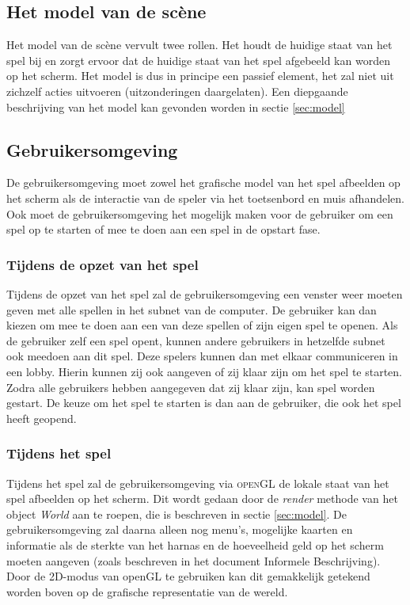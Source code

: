 \documentclass[a4paper,11pt]{article}
\begin{document}
    \subsection{Het model van de sc\`ene}
    Het model van de sc\`ene vervult twee rollen. Het houdt de huidige staat van het spel bij en zorgt ervoor dat de huidige staat van het spel afgebeeld kan worden op het scherm. Het model is dus in principe een passief element, het zal niet uit zichzelf acties uitvoeren (uitzonderingen daargelaten). Een diepgaande beschrijving van het model kan gevonden worden in sectie \ref{sec:model}

    \subsection{Gebruikersomgeving}
   	De gebruikersomgeving moet zowel het grafische model van het spel afbeelden op het scherm als de interactie van de speler via het toetsenbord en muis afhandelen. Ook moet de gebruikersomgeving het mogelijk maken voor de gebruiker om een spel op te starten of mee te doen aan een spel in de opstart fase.

    \subsubsection{Tijdens de opzet van het spel}
    Tijdens de opzet van het spel zal de gebruikersomgeving een venster weer moeten geven met alle spellen in het subnet van de computer. De gebruiker kan dan kiezen om mee te doen aan een van deze spellen of zijn eigen spel te openen. Als de gebruiker zelf een spel opent, kunnen andere gebruikers in hetzelfde subnet ook meedoen aan dit spel. Deze spelers kunnen dan met elkaar communiceren in een lobby. Hierin kunnen zij ook aangeven of zij klaar zijn om het spel te starten. Zodra alle gebruikers hebben aangegeven dat zij klaar zijn, kan spel worden gestart. De keuze om het spel te starten is dan aan de gebruiker, die ook het spel heeft geopend.

    \subsubsection{Tijdens het spel}
    Tijdens het spel zal de gebruikersomgeving via \textsc{openGL} de lokale staat van het spel afbeelden op het scherm. Dit wordt gedaan door de \emph{render} methode van het object \emph{World} aan te roepen, die is beschreven in sectie \ref{sec:model}. De gebruikersomgeving zal daarna alleen nog menu's, mogelijke kaarten en informatie als de sterkte van het harnas en de hoeveelheid geld op het scherm moeten aangeven (zoals beschreven in het document Informele Beschrijving). Door de 2D-modus van openGL te gebruiken kan dit gemakkelijk getekend worden boven op de grafische representatie van de wereld.
\end{document}
